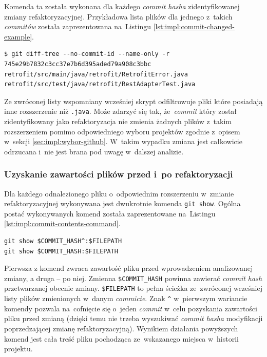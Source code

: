 \documentclass[twoside]{praca}
\begin{document}
Komenda ta została wykonana dla każdego \textit{commit hasha} zidentyfikowanej zmiany refaktoryzacyjnej. Przykładowa lista plików dla jednego z~takich \textit{commitów} została zaprezentowana na~Listingu \ref{lst:impl:commit-changed-example}.

\begin{lstlisting}[frame=single,caption={Przykładowy wynik komendy prezentującej listę zmienionych plików w~zadanym \textit{commicie}},captionpos=b,label={lst:impl:commit-changed-example}]
$ git diff-tree --no-commit-id --name-only -r 745e29b7832c3cc37e7b6d395aded79a908c3bbc
retrofit/src/main/java/retrofit/RetrofitError.java
retrofit/src/test/java/retrofit/RestAdapterTest.java
\end{lstlisting}

Ze zwróconej listy wspomniany wcześniej skrypt odfiltrowuje pliki które posiadają inne rozszerzenie niż \texttt{.java}. Może zdarzyć się tak, że~\textit{commit} który został zidentyfikowany jako refaktoryzacja nie zmienia żadnych plików z~takim rozszerzeniem pomimo odpowiedniego wyboru projektów zgodnie z~opisem w~sekcji \ref{sec:impl:wybor-github}. W~takim wypadku zmiana jest całkowicie odrzucana i~nie jest brana pod uwagę w~dalszej analizie.

\subsubsection{Uzyskanie zawartości plików przed i~po refaktoryzacji}
Dla każdego odnalezionego pliku o~odpowiednim rozszerzeniu w~zmianie refaktoryzacyjnej wykonywana jest dwukrotnie komenda \texttt{git show}. Ogólna postać wykonywanych komend została zaprezentowane na~Listingu \ref{lst:impl:commit-contents-command}.

\begin{lstlisting}[frame=single,caption={Komendy pozwalające na~otrzymanie zawartości pliku przed i~po wykonaniu danej zmiany},captionpos=b,label={lst:impl:commit-contents-command}]
git show $COMMIT_HASH^:$FILEPATH
git show $COMMIT_HASH:$FILEPATH
\end{lstlisting}

Pierwsza z komend zwraca zawartość pliku przed wprowadzeniem analizowanej zmiany, a druga -- po niej. Zmienna \texttt{\$COMMIT\_HASH} powinna zawierać \textit{commit hash} przetwarzanej obecnie zmiany. \texttt{\$FILEPATH} to pełna ścieżka ze~zwróconej wcześniej listy plików zmienionych w~danym \textit{commicie}. Znak \texttt{\^} w~pierwszym wariancie komendy pozwala na~cofnięcie się o~jeden \textit{commit} w~celu pozyskania zawartości pliku przed zmianą (dzięki temu nie trzeba wyszukiwać \textit{commit hasha} modyfikacji poprzedzającej zmianę refaktoryzacyjną). Wynikiem działania powyższych komend jest cała treść pliku pochodząca ze~wskazanego miejsca w~historii projektu.
\end{document}
